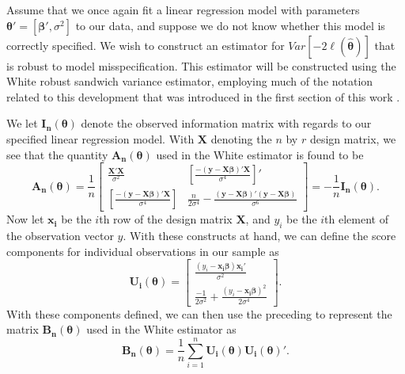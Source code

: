 \documentclass[submit]{smj}
\begin{document}
		Assume that we once again fit a linear regression model with parameters $\bm{\theta}' = [\bm{\beta}', \sigma^2]$ to our data, and suppose we do not know whether this model is correctly specified.
		We wish to construct an estimator for $Var \left[ -2 \ell (\hat{\bm{\theta}}  ) \right]$ that is robust to model misspecification. This estimator will be constructed using the White robust
		sandwich variance estimator, employing much of the notation related to this development that was introduced in the first section of this work \citep{White1980}.

		We let $\bm{I_{n}} (\bm{\theta})$ denote the observed information matrix with regards to our specified linear regression model. With $\bm{X}$ denoting the $n$ by $r$ design matrix, we see that
		the quantity $\bm{A_n} (\bm{\theta})$ used in the White estimator is found to be 
		\begin{equation*}
			\bm{A_n}(\bm{\theta}) = \frac{1}{n}
			\begin{bmatrix}
				\frac{\bm{X}'\bm{X}}{\sigma^2} & \left[ \frac{-(\bm{y}-\bm{X}\bm{\beta})'\bm{X}}{\sigma^4} \right]' \\
				\left[ \frac{-(\bm{y}-\bm{X}\bm{\beta})'\bm{X}}{\sigma^4} \right] &  \frac{n}{2 \sigma^4} - \frac{(\bm{y}-\bm{X}\bm{\beta})'(\bm{y}-\bm{X}\bm{\beta})}{\sigma^6}
				\end{bmatrix}
				= -\frac{1}{n} \bm{I_n}(\bm{\theta}) .
		\end{equation*}
		Now let $\bm{x_i}$ be the $i$th row of the design matrix $\bm{X}$, and $y_i$ be the $i$th element of the observation vector $y$. With these constructs at hand, we can define the score components
		for individual observations in our sample as
		\begin{equation*}
			\bm{U_i}(\bm{\theta}) = 
			\begin{bmatrix}
				\frac{(y_i-\bm{x_i} \bm{\beta})\bm{x_i}'}{\sigma^2} \\
				\frac{-1}{2 \sigma^2} + \frac{(y_i - \bm{x_i} \bm{\beta})^2}{2 \sigma^4}
			\end{bmatrix}
			.
		\end{equation*}
		With these components defined, we can then use the preceding to represent the matrix $\bm{B_n} (\bm{\theta})$ used in the White estimator as
		\begin{equation*}
			\bm{B_n}(\bm{\theta}) = \frac{1}{n} \sum_{i=1}^{n} \bm{U_i}(\bm{\theta}) \bm{U_i}(\bm{\theta})' .
		\end{equation*}
\end{document}
